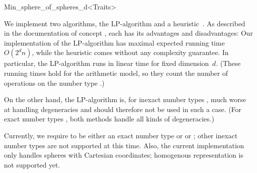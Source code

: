 \begin{ccRefClass}{Min_sphere_of_spheres_d<Traits>}
%

\ccImplementation
\ccIndexImplementation
{}

We implement two algorithms, the LP-algorithm and a
heuristic~\cite{msw-sblp-92}.  As described in the documentation of
concept , each has its advantages and
disadvantages: Our implementation of the LP-algorithm has maximal
expected running time $O(2^d n)$, while the heuristic comes without
any complexity guarantee.  In particular, the LP-algorithm runs in
linear time for fixed dimension~$d$. (These running times hold for the
arithmetic model, so they count the number of operations on
the number type .)

On the other hand, the LP-algorithm is, for inexact number types
, much worse at handling degeneracies and should therefore not
be used in such a case.  (For exact number types
, both methods handle all kinds of degeneracies.)

Currently, we require  to be either an exact number
type or  or ; other inexact number types are
not supported at this time.  Also, the current implementation only
handles spheres with Cartesian coordinates; homogenous representation
is not supported yet.

\ccExample
{}

\end{ccRefClass}


